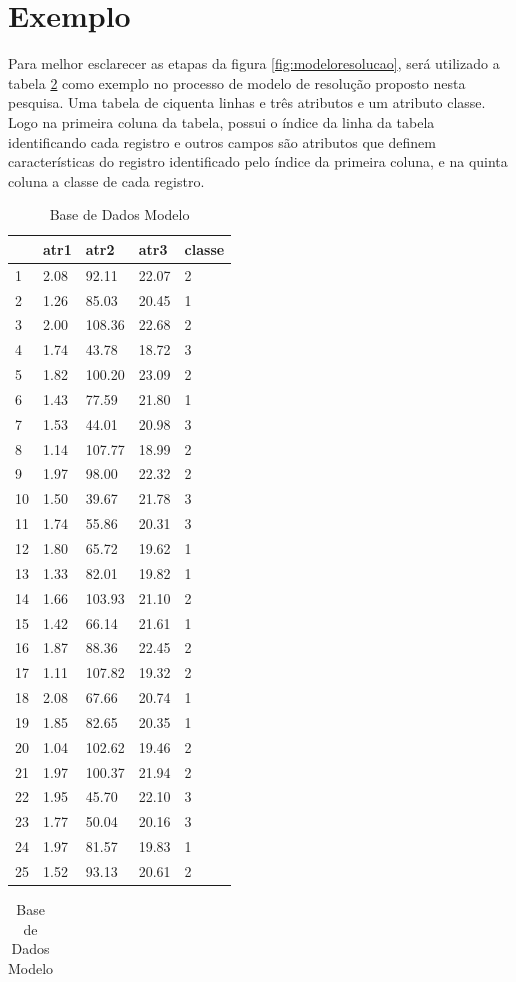 \section{Exemplo} \label{cap:ferramentas:sec:exebasemodfic}

Para melhor esclarecer as etapas da figura \ref{fig:modeloresolucao}, será utilizado  a tabela \ref{tab:bdm} como exemplo no processo de modelo de resolução proposto nesta pesquisa. Uma tabela de ciquenta linhas e três atributos e um atributo classe. Logo na primeira coluna da tabela, possui o índice da linha da tabela identificando cada registro e outros campos são atributos que definem características do registro identificado pelo índice da primeira coluna, e na quinta coluna a classe de cada registro.

\begin{table}[!ht]
\centering
\caption{Base de Dados Modelo}
\label{tab:bdm}
\begin{tabular}{|lllll|}
\hline 
  & atr1 & atr2 & atr3 & classe \\ \hline
1 & 2.08 & 92.11 & 22.07 & 2 \\ \hline
2 & 1.26 & 85.03 & 20.45 & 1 \\ \hline
3 & 2.00 & 108.36 & 22.68 & 2 \\ \hline
4 & 1.74 & 43.78 & 18.72 & 3 \\ \hline
5 & 1.82 & 100.20 & 23.09 & 2 \\ \hline
6 & 1.43 & 77.59 & 21.80 & 1 \\ \hline
7 & 1.53 & 44.01 & 20.98 & 3 \\ \hline
8 & 1.14 & 107.77 & 18.99 & 2 \\ \hline
9 & 1.97 & 98.00 & 22.32 & 2 \\ \hline
10 & 1.50 & 39.67 & 21.78 & 3 \\ \hline
11 & 1.74 & 55.86 & 20.31 & 3 \\ \hline
12 & 1.80 & 65.72 & 19.62 & 1 \\ \hline
13 & 1.33 & 82.01 & 19.82 & 1 \\ \hline
14 & 1.66 & 103.93 & 21.10 & 2 \\ \hline
15 & 1.42 & 66.14 & 21.61 & 1 \\ \hline
16 & 1.87 & 88.36 & 22.45 & 2 \\ \hline
17 & 1.11 & 107.82 & 19.32 & 2 \\ \hline
18 & 2.08 & 67.66 & 20.74 & 1 \\ \hline
19 & 1.85 & 82.65 & 20.35 & 1 \\ \hline
20 & 1.04 & 102.62 & 19.46 & 2 \\ \hline
21 & 1.97 & 100.37 & 21.94 & 2 \\ \hline
22 & 1.95 & 45.70 & 22.10 & 3 \\ \hline
23 & 1.77 & 50.04 & 20.16 & 3 \\ \hline
24 & 1.97 & 81.57 & 19.83 & 1 \\ \hline
25 & 1.52 & 93.13 & 20.61 & 2 \\ \hline
  \end{tabular}
  \begin{tabular}{ |lllll| }
   

\end{tabular}
\end{table}
